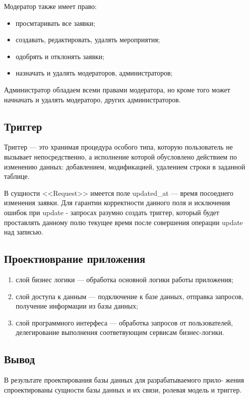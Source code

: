 Модератор также имеет право:
\begin{itemize}[label=---]
	\item просмтаривать все заявки;
	\item создавать, редактировать, удалять мероприятия;
	\item одобрять и отклонять заявки;
	\item назначать и удалять модераторов, администраторов;
\end{itemize}

Администратор обладаем всеми правами модератора, но кроме того может начначать и удалять модераторо, других администраторов.

\subsection{Триггер}

Триггер — это хранимая процедура особого типа, которую пользователь не вызывает непосредственно, а исполнение которой обусловлено действием по изменению данных: добавлением, модификацией, удалением строки в заданной таблице.

В сущности <<Request>> имеется поле updated{\_}at --- время посоеднего изменения заявки. Для гарантии корректности данного поля и исключения ошибок при update - запросах разумно создать триггер, который будет проставлять данному полю текущее время после совершения операции update над записью.

\subsection{Проектиоврание приложения}

\begin{enumerate}
	\item слой бизнес логики --- обработка основной логики работы приложения;
	\item слой доступа к данным --- подключение к базе данных, отправка запросов, получение информации из базы данных;
	\item слой программного интерфеса --- обработка запросов от пользователей, делегирование выполнения соответвующим сервисам бизнес-логики.
\end{enumerate}

\subsection{Вывод}

В результате проектирования базы данных для разрабатываемого прило-
жения спроектированы сущности базы данных и их связи, ролевая модель и триггер.

\pagebreak
